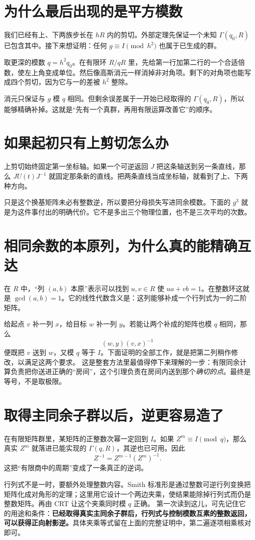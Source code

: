 \section{为什么最后出现的是平方模数}
我们已经有上、下两族步长在 $hR$ 内的剪切。外部定理先保证一个未知 $\Gamma(q_0,R)$ 已包含其中。接下来想证明：任何 $g\equiv I\pmod{h^2}$ 也属于已生成的群。

取更深的模数 $q=h^2q_0$。在有限环 $R/qR$ 里，先给第一行加第二行的一个合适倍数，使左上角变成单位。然后像高斯消元一样消掉非对角项。剩下的对角项也能写成四个剪切，因为它与一的差被 $h^2$ 整除。

消元只保证与 $g$ 模 $q$ 相同。但剩余误差属于一开始已经取得的 $\Gamma(q_0,R)$，所以能够精确补掉。这就是“先有一个真群，再用有限运算改善它”的顺序。

\section{如果起初只有上剪切怎么办}
上剪切始终固定第一坐标轴。如果一个可逆返回 $J$ 把这条轴送到另一条直线，那么 $JU(t)J^{-1}$ 就固定那条新的直线。把两条直线当成坐标轴，就看到了上、下两种方向。

只是这个换基矩阵未必有整数逆，所以要把分母损失写进同余模数。下面的 $g^3$ 就是为这件事付出的明确代价。它不是多出三个物理位置，也不是三次平均的次数。

\section{相同余数的本原列，为什么真的能精确互达}
在 $R$ 中，“列 $(a,b)$ 本原”表示可以找到 $u,v\in R$ 使 $ua+vb=1$。在整数环这就是 $\gcd(a,b)=1$。它的线性代数含义是：这列能够补成一个行列式为一的二阶矩阵。

给起点 $v$ 补一列 $x$，给目标 $w$ 补一列 $y$。若能让两个补成的矩阵也模 $q$ 相同，那么
\[(w,y)(v,x)^{-1}
\]
便既把 $v$ 送到 $w$，又模 $q$ 等于 $I$。下面证明的全部工作，就是把第二列稍作修改，以满足这两个要求。
这是整套方法里最值得停下来理解的一步：有限同余计算负责把你送进正确的“房间”，这个引理负责在房间内送到那个\emph{确切的点}。最终是等号，不是取极限。

\section{取得主同余子群以后，逆更容易造了}
在有限矩阵群里，某矩阵的正整数次幂一定回到 $I$。如果 $Z^m\equiv I\pmod q$，那么真实 $Z^m$ 就落进已能实现的 $\Gamma(q,R)$，其逆也已可用。因此
\[Z^{-1}=Z^{m-1}(Z^m)^{-1}.
\]
这把“有限商中的周期”变成了一条真正的逆词。

行列式不是一时，要额外处理整数内容。Smith 标准形是通过整数可逆行列变换把矩阵化成对角形的定理；这里用它设计一个两边夹乘，使结果能除掉行列式而仍是整数矩阵。再由 CRT 让这个夹乘同时模 $q$ 正确。
第一次读到这儿，可先记住它的用途和条件：\textbf{已经取得真实主同余子群后，行列式与控制模数互素的整数返回，可以获得正向射影逆。}具体夹乘等式留在上面的完整证明中，第二遍逐项相乘核对即可。
